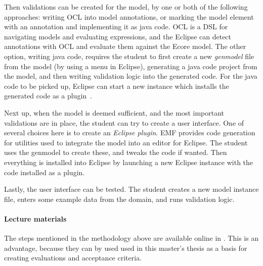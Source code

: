 Then validations can be created for the model, by one or both of the following approaches: writing \acrfull{OCL} into model annotations, or marking the model element with an annotation and implementing it as java code.
\Acrshort{OCL} is a \acrlong{DSL} for navigating models and evaluating expressions, and the \gls{Eclipse} can detect annotations with \acrshort{OCL} and evaluate them against the \gls{Ecore} model.
The other option, writing java code, requires the student to first create a new \textit{genmodel} file from the model (by using a menu in \gls{Eclipse}), generating a java code project from the model, and then writing validation logic into the generated code.
For the java code to be picked up, \gls{Eclipse} can start a new instance which installs the generated code as a plugin~\cite{hallvardtraettebergConstraintsValidationTDT42502020}.


Next up, when the model is deemed sufficient, and the most important validations are in place, the student can try to create a user interface.
One of several choices here is to create an \textit{\gls{Eclipse} plugin}.
\Acrshort{EMF} provides code generation for utilities used to integrate the model into an editor for \gls{Eclipse}.
The student uses the genmodel to create these, and tweaks the code if wanted.
Then everything is installed into \gls{Eclipse} by launching a new \gls{Eclipse} instance with the code installed as a plugin.


Lastly, the user interface can be tested.
The student creates a new model instance file, enters some example data from the domain, and runs validation logic.

\paragraph{Lecture materials}\label{par:tdt4250-confluence}
The steps mentioned in the methodology above are available online in \cite{hallvardtraettebergEMFStepbystepTDT42502017,hallvardtraettebergConstraintsValidationTDT42502020,hallvardtraettebergEditingEcoreModel2017,hallvardtraettebergGenmodelTDT4250NTNU2017}.
This is an advantage, because they can by used used in this master's thesis as a basis for creating evaluations and acceptance criteria.
